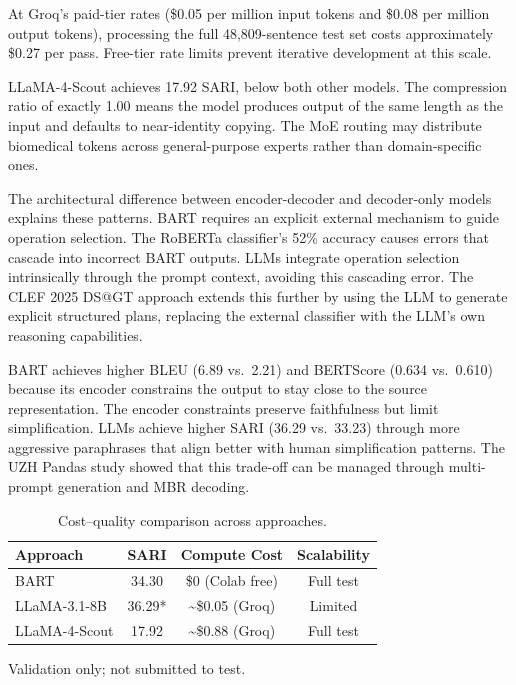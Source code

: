 \documentclass{ceurart}
\begin{document}
At Groq's paid-tier rates (\$0.05 per million input tokens and \$0.08 per million output tokens), processing the full 48,809-sentence test set costs approximately \$0.27 per pass. Free-tier rate limits prevent iterative development at this scale.

LLaMA-4-Scout achieves 17.92 SARI, below both other models. The compression ratio of exactly 1.00 means the model produces output of the same length as the input and defaults to near-identity copying. The MoE routing may distribute biomedical tokens across general-purpose experts rather than domain-specific ones.

The architectural difference between encoder-decoder and decoder-only models explains these patterns. BART requires an explicit external mechanism to guide operation selection. The RoBERTa classifier's 52\% accuracy causes errors that cascade into incorrect BART outputs. LLMs integrate operation selection intrinsically through the prompt context, avoiding this cascading error. The CLEF 2025 DS@GT approach \cite{marturi2025simpletext} extends this further by using the LLM to generate explicit structured plans, replacing the external classifier with the LLM's own reasoning capabilities.

BART achieves higher BLEU (6.89 vs.\ 2.21) and BERTScore (0.634 vs.\ 0.610) because its encoder constrains the output to stay close to the source representation. The encoder constraints preserve faithfulness but limit simplification. LLMs achieve higher SARI (36.29 vs.\ 33.23) through more aggressive paraphrases that align better with human simplification patterns. The UZH Pandas study \cite{michail2024simpletext} showed that this trade-off can be managed through multi-prompt generation and MBR decoding.

\begin{table}[t]
\centering
\caption{Cost--quality comparison across approaches.}
\label{tab:cost}
\begin{tabular}{lccc}
\toprule
Approach & SARI & Compute Cost & Scalability \\
\midrule
BART & 34.30 & \$0 (Colab free) & Full test \\
LLaMA-3.1-8B & 36.29* & \textasciitilde{}\$0.05 (Groq) & Limited \\
LLaMA-4-Scout & 17.92 & \textasciitilde{}\$0.88 (Groq) & Full test \\
\bottomrule
\end{tabular}
\small *Validation only; not submitted to test.
\end{table}
\end{document}
